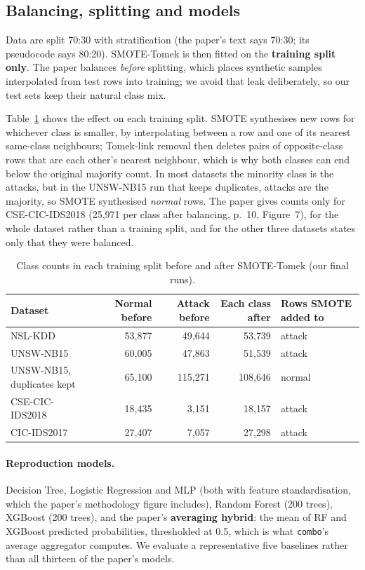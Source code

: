 \documentclass[11pt,a4paper]{article}
\begin{document}
\subsection{Balancing, splitting and models}
Data are split 70:30 with stratification (the paper's text says 70:30; its pseudocode says 80:20). SMOTE-Tomek is
then fitted on the \textbf{training split only}. The paper balances \emph{before} splitting, which places synthetic
samples interpolated from test rows into training; we avoid that leak deliberately, so our test sets keep their
natural class mix.

Table~\ref{tab:smote} shows the effect on each training split. SMOTE synthesises new rows for whichever class is
smaller, by interpolating between a row and one of its nearest same-class neighbours; Tomek-link removal then
deletes pairs of opposite-class rows that are each other's nearest neighbour, which is why both classes can end
below the original majority count. In most datasets the minority class is the attacks, but in the UNSW-NB15 run
that keeps duplicates, attacks are the majority, so SMOTE synthesised \emph{normal} rows. The paper gives counts
only for CSE-CIC-IDS2018 (25{,}971 per class after balancing, p.~10, Figure~7), for the whole dataset rather than a
training split, and for the other three datasets states only that they were balanced.

\begin{table}[H]
\centering
\caption{Class counts in each training split before and after SMOTE-Tomek (our final runs).}
\label{tab:smote}
\small
\begin{tabular}{lrrrl}
\toprule
Dataset & Normal before & Attack before & Each class after & Rows SMOTE added to \\
\midrule
NSL-KDD                     & 53{,}877  & 49{,}644  & 53{,}739  & attack \\
UNSW-NB15                   & 60{,}005  & 47{,}863  & 51{,}539  & attack \\
UNSW-NB15, duplicates kept  & 65{,}100  & 115{,}271 & 108{,}646 & normal \\
CSE-CIC-IDS2018             & 18{,}435  & 3{,}151   & 18{,}157  & attack \\
CIC-IDS2017                 & 27{,}407  & 7{,}057   & 27{,}298  & attack \\
\bottomrule
\end{tabular}
\end{table}

\paragraph{Reproduction models.} Decision Tree, Logistic Regression and MLP (both with feature standardisation,
which the paper's methodology figure includes), Random Forest (200 trees), XGBoost (200 trees), and the paper's
\textbf{averaging hybrid}: the mean of RF and XGBoost predicted probabilities, thresholded at 0.5, which is what
\texttt{combo}'s average aggregator computes. We evaluate a representative five baselines rather than all
thirteen of the paper's models.
\end{document}
